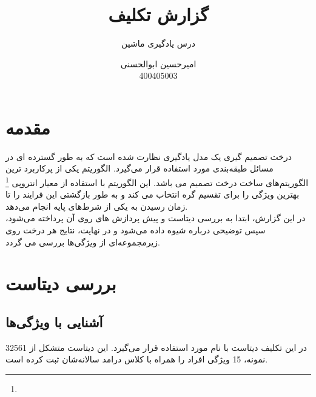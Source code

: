 \documentclass{article}
\title{گزارش تکلیف 
	\lr{ID3 Algorithm}
}
\author{درس یادگیری ماشین}
\date{
	امیرحسین ابوالحسنی\\
	400405003
}
\begin{document}
	\maketitle
	\newpage
	\tableofcontents
	\newpage
	\section{مقدمه}
	درخت تصمیم گیری یک مدل یادگیری نظارت شده است که به طور گسترده ای در مسائل طبقه‌بندی مورد استفاده قرار می‌گیرد.
	الگوریتم  یکی از پرکاربرد ترین الگوریتم‌های ساخت درخت تصمیم می باشد. این الگوریتم با استفاده از معیار انتروپی
	\footnote{}
	بهترین ویژگی را برای تقسیم گره انتخاب می کند و به طور بازگشتی این فرایند را تا زمان رسیدن به یکی از شرط‌های پایه انجام می‌دهد.\\
	در این گزارش، ابتدا به بررسی دیتاست و پیش پردازش های روی آن پرداخته می‌شود، سپس توضیحی درباره شیوه 
	داده می‌شود و در نهایت، نتایج هر درخت روی زیرمجموعه‌ای از ویژگی‌ها بررسی می گردد.
	
	\section{بررسی دیتاست}
	\subsection{آشنایی با ویژگی‌ها}
	در این تکلیف دیتاست با نام 
	مورد استفاده قرار می‌گیرد. این دیتاست متشکل از 32561 نمونه، 15 ویژگی افراد را همراه با کلاس درامد سالانه‌شان ثبت کرده است.
	
\end{document}
